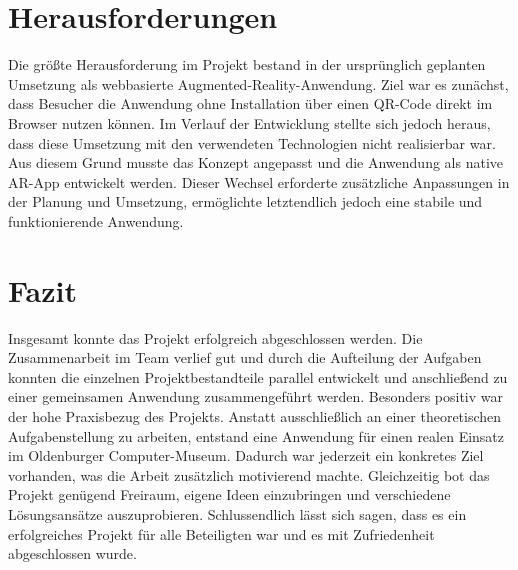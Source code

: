 \section{Herausforderungen}
Die größte Herausforderung im Projekt bestand in der ursprünglich geplanten Umsetzung als webbasierte Augmented-Reality-Anwendung. Ziel war es zunächst, dass Besucher die Anwendung ohne Installation über einen QR-Code direkt im Browser nutzen können. Im Verlauf der Entwicklung stellte sich jedoch heraus, dass diese Umsetzung mit den verwendeten Technologien nicht realisierbar war. Aus diesem Grund musste das Konzept angepasst und die Anwendung als native AR-App entwickelt werden. Dieser Wechsel erforderte zusätzliche Anpassungen in der Planung und Umsetzung, ermöglichte letztendlich jedoch eine stabile und funktionierende Anwendung. 

\section{Fazit}
Insgesamt konnte das Projekt erfolgreich abgeschlossen werden. Die Zusammenarbeit im Team verlief gut und durch die Aufteilung der Aufgaben konnten die einzelnen Projektbestandteile parallel entwickelt und anschließend zu einer gemeinsamen Anwendung zusammengeführt werden. Besonders positiv war der hohe Praxisbezug des Projekts. Anstatt ausschließlich an einer theoretischen Aufgabenstellung zu arbeiten, entstand eine Anwendung für einen realen Einsatz im Oldenburger Computer-Museum. Dadurch war jederzeit ein konkretes Ziel vorhanden, was die Arbeit zusätzlich motivierend machte. Gleichzeitig bot das Projekt genügend Freiraum, eigene Ideen einzubringen und verschiedene Lösungsansätze auszuprobieren. Schlussendlich lässt sich sagen, dass es ein erfolgreiches Projekt für alle Beteiligten war und es mit Zufriedenheit abgeschlossen wurde.